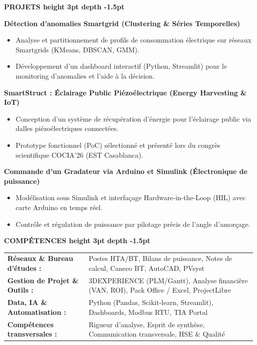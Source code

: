 \documentclass[10pt,a4paper]{altacv}
\renewcommand{\cvsection}[2][]{%
  \vspace{4pt}%
  {\color{heading}\Large\bfseries #2 \hspace{0.2em}\leaders\vrule height 3pt depth -1.5pt\hfill\mbox{}}\par\vspace{3pt}
}
\begin{document}
\cvsection{PROJETS}
{\normalsize\bfseries\color{accent} Détection d’anomalies Smartgrid (Clustering \& Séries Temporelles)}\par\vspace{1.5pt}
\begin{itemize}[leftmargin=*, label=\textbullet, nosep, itemsep=1.5pt]
  \item Analyse et partitionnement de profils de consommation électrique sur réseaux Smartgrids (KMeans, DBSCAN, GMM).
  \item Développement d’un dashboard interactif (Python, Streamlit) pour le monitoring d’anomalies et l’aide à la décision.
\end{itemize}
\vspace{2pt}
{\normalsize\bfseries\color{accent} SmartStruct : Éclairage Public Piézoélectrique (Energy Harvesting \& IoT)}\par\vspace{1.5pt}
\begin{itemize}[leftmargin=*, label=\textbullet, nosep, itemsep=1.5pt]
  \item Conception d’un système de récupération d’énergie pour l’éclairage public via dalles piézoélectriques connectées.
  \item Prototype fonctionnel (PoC) sélectionné et présenté lors du congrès scientifique COCIA’26 (EST Casablanca).
\end{itemize}
\vspace{2pt}
{\normalsize\bfseries\color{accent} Commande d’un Gradateur via Arduino et Simulink (Électronique de puissance)}\par\vspace{1.5pt}
\begin{itemize}[leftmargin=*, label=\textbullet, nosep, itemsep=1.5pt]
  \item Modélisation sous Simulink et interfaçage Hardware-in-the-Loop (HIL) avec carte Arduino en temps réel.
  \item Contrôle et régulation de puissance par pilotage précis de l’angle d’amorçage.
\end{itemize}

\cvsection{COMPÉTENCES}
\begin{tabular}{@{}ll@{}}
\textbf{Réseaux \& Bureau d’études :} & Postes HTA/BT, Bilans de puissance, Notes de calcul, Caneco BT, AutoCAD, PVsyst \\[1.5pt]
\textbf{Gestion de Projet \& Outils :} & 3DEXPERIENCE (PLM/Gantt), Analyse financière (VAN, ROI), Pack Office / Excel, ProjectLibre \\[1.5pt]
\textbf{Data, IA \& Automatisation :} & Python (Pandas, Scikit-learn, Streamlit), Dashboards, Modbus RTU, TIA Portal \\[1.5pt]
\textbf{Compétences transversales :} & Rigueur d’analyse, Esprit de synthèse, Communication transversale, HSE \& Qualité
\end{tabular}
\end{document}
